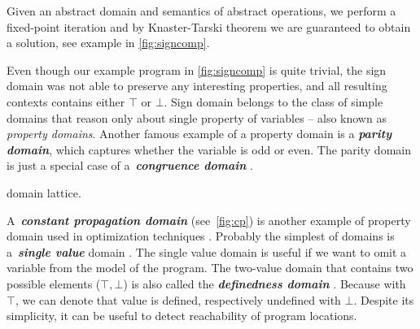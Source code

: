 \prule
\bigskip

Given an abstract domain and semantics of abstract operations, we perform a fixed-point iteration and by Knaster-Tarski
theorem \cite{Tarski1955} we are guaranteed to obtain a solution, see example in
\autoref{fig:signcomp}.

Even though our example program in \autoref{fig:signcomp} is quite trivial, the
sign domain  was not able to preserve any interesting properties,
and all resulting contexts contains either $\top$ or $\bot$.  Sign domain belongs to
the class of simple domains that reason only about single property of variables --
also known as \emph{property domains}. Another famous example of a property
domain is a \textbf{\emph{parity domain}}, which captures whether the
variable is odd or even. The parity domain is just a special case of
a~\textbf{\emph{congruence domain}} \cite{Granger1989, Granger1991}.
\begin{marginfigure}%
    \centering
{}
    \caption{ domain lattice.}
    \label{fig:cp}%
\end{marginfigure}%
A~\textbf{\emph{constant propagation domain}} 
(see~\autoref{fig:cp}) is another example of property domain used in
optimization techniques \cite{Kildall1973}. Probably the simplest of domains is
a~\textbf{\emph{single value}} domain . The single value domain is
useful if we want to omit a variable from the model of the program. The
two-value domain that contains two possible elements ($\top, \bot$) is also
called the \textbf{\emph{definedness domain}} . Because with $\top$,
we can denote that value is defined, respectively undefined with $\bot$.
Despite its simplicity, it can be useful to detect reachability of program
locations.

